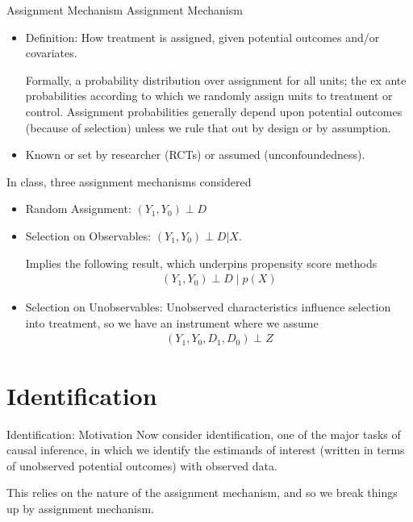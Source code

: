 \documentclass[aspectratio=169, handout]{beamer}
\begin{document}
{\scriptsize
\begin{frame}{Assignment Mechanism}
Assignment Mechanism
\begin{itemize}
  \item \alert{Definition}: How treatment is assigned, given potential
    outcomes and/or covariates.

    \alert{Formally}, a probability distribution over assignment for all
    units; the ex ante probabilities according to which we randomly
    assign units to treatment or control.
    Assignment probabilities generally depend upon potential outcomes
    (because of selection) unless we rule that out by design or by
    assumption.
  \item Known or set by researcher (RCTs) or assumed (unconfoundedness).
\end{itemize}
In class, three assignment mechanisms considered
\begin{itemize}
  \item \alert{Random Assignment}:
    $(Y_1,Y_0)\perp D$
  \item \alert{Selection on Observables}:
    $(Y_1,Y_0)\perp D | X$.

    Implies the following result, which underpins propensity
    score methods
    \begin{align*}
      (Y_1,Y_0)\perp D \;|\; p(X)
    \end{align*}

  \item
    \alert{Selection on Unobservables}:
    Unobserved characteristics influence selection into treatment, so we
    have an instrument where we assume
    \begin{align*}
      (Y_1,Y_0,D_1,D_0)\perp Z
    \end{align*}
\end{itemize}
\end{frame}
}



\section{Identification}

{\footnotesize
\begin{frame}{Identification: Motivation}
Now consider identification, one of the major tasks of causal inference,
in which we identify the estimands of interest (written in terms of
unobserved potential outcomes) with observed data.

This relies on the nature of the assignment mechanism, and so we break
things up by assignment mechanism.
\end{frame}
}
\end{document}

